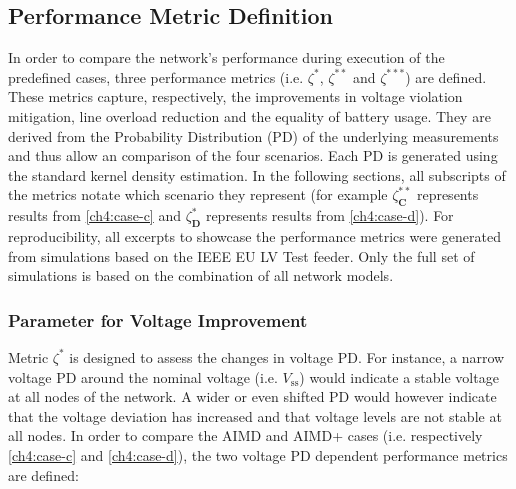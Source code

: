 \subsection{Performance Metric Definition}
\label{ch4:subsec:performance-metric-definition}

In order to compare the network's performance during execution of the predefined cases, three performance metrics (i.e. $\zeta^{*}$, $\zeta^{**}$ and $\zeta^{***}$) are defined.
These metrics capture, respectively, the improvements in voltage violation mitigation, line overload reduction and the equality of battery usage.
They are derived from the Probability Distribution (PD) of the underlying measurements and thus allow an comparison of the four scenarios.
Each PD is generated using the standard kernel density estimation.
In the following sections, all subscripts of the metrics notate which scenario they represent (for example $\zeta_\textbf{C}^{**}$ represents results from \ref{ch4:case-c} and $\zeta_\textbf{D}^{*}$ represents results from \ref{ch4:case-d}).
For reproducibility, all excerpts to showcase the performance metrics were generated from simulations based on the IEEE EU LV Test feeder.
Only the full set of simulations is based on the combination of all network models.

\subsubsection{Parameter for Voltage Improvement}

Metric $\zeta^{*}$ is designed to assess the changes in voltage PD.
For instance, a narrow voltage PD around the nominal voltage (i.e. $V_\text{ss}$) would indicate a stable voltage at all nodes of the network.
A wider or even shifted PD would however indicate that the voltage deviation has increased and that voltage levels are not stable at all nodes.
In order to compare the AIMD and AIMD+ cases (i.e. respectively \ref{ch4:case-c} and \ref{ch4:case-d}), the two voltage PD dependent performance metrics are defined:


